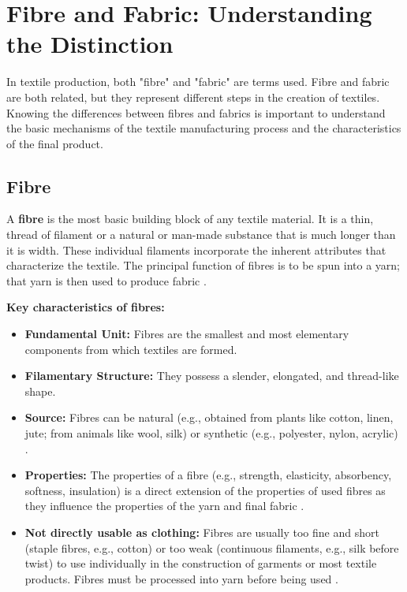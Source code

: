 \section{Fibre and Fabric: Understanding the Distinction}

In textile production, both "fibre" and "fabric" are terms used. Fibre and fabric are both related, but they represent different steps in the creation of textiles. Knowing the differences between fibres and fabrics is important to understand the basic mechanisms of the textile manufacturing process and the characteristics of the final product.

\subsection{Fibre}

A \textbf{fibre} is the most basic building block of any textile material. It is a thin, thread of filament or a natural or man-made substance that is much longer than it is width. These individual filaments incorporate the inherent attributes that characterize the textile. The principal function of fibres is to be spun into a yarn; that yarn is then used to produce fabric \cite{researchgate}.

\textbf{Key characteristics of fibres:}
\begin{itemize}
    \item \textbf{Fundamental Unit:} Fibres are the smallest and most elementary components from which textiles are formed.
    \item \textbf{Filamentary Structure:} They possess a slender, elongated, and thread-like shape.
    \item \textbf{Source:} Fibres can be natural (e.g., obtained from plants like cotton, linen, jute; from animals like wool, silk) or synthetic (e.g., polyester, nylon, acrylic) \cite{researchgate}.
    \item \textbf{Properties:} The properties of a fibre (e.g., strength, elasticity, absorbency, softness, insulation) is a direct extension of the properties of used fibres as they influence the properties of the yarn and final fabric \cite{researchgate}.
    \item \textbf{Not directly usable as clothing:}  Fibres are usually too fine and short (staple fibres, e.g., cotton) or too weak (continuous filaments, e.g., silk before twist) to use individually in the construction of garments or most textile products. Fibres must be processed into yarn before being used \cite{researchgate}.
\end{itemize}

